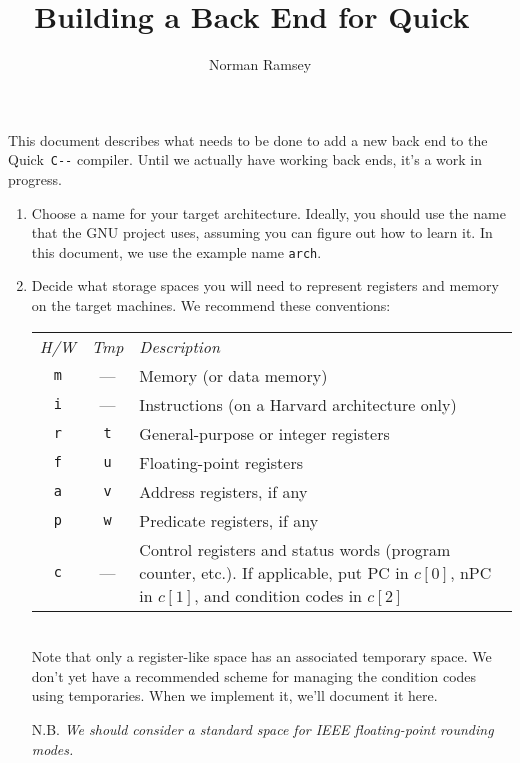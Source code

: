 \documentclass[12pt]{article}
\title{Building a Back End for Quick~{\PAL}}
\author{Norman Ramsey}
\newcommand\PAL{\texttt{C-{}-}}
\begin{document}
\maketitle

This document describes what needs to be done to add a new back end to
the Quick~{\PAL} compiler.
Until we actually have working back ends, it's a work in progress.

\begin{enumerate}
\item
Choose a name for your target architecture.
Ideally, you should use the name that the GNU project uses, assuming
you can figure out how to learn it.
In this document, we use the example name \texttt{arch}.
\item
Decide what storage spaces you will need to represent registers and
memory on the target machines.
We recommend these conventions:\\[3pt]
\begin{tabularx}{\linewidth}{@{\hskip1.5em}cc>{\raggedright\arraybackslash}X@{}}
\emph{H/W}& \emph{Tmp}& \emph{Description}\\
\texttt m& --- & Memory (or data memory)\\
\texttt i& --- & Instructions (on a Harvard architecture only)\\
\texttt r& \texttt t& General-purpose or integer registers\\
\texttt f& \texttt u& Floating-point registers\\
\texttt a& \texttt v& Address registers, if any\\
\texttt p& \texttt w& Predicate registers, if any\\
\texttt c& ---      & Control registers and status words (program
counter, etc.).  
If applicable, put PC in $c[0]$, nPC in $c[1]$, and condition
codes in $c[2]$\\
\end{tabularx}\\[3pt]
Note that only a register-like space has an associated temporary
space.
We don't yet have a recommended scheme for managing the condition
codes using temporaries. 
When we implement it, we'll document it here.

N.B. \emph{We should consider a standard space for IEEE floating-point
rounding modes.}



\end{enumerate}
\end{document}
